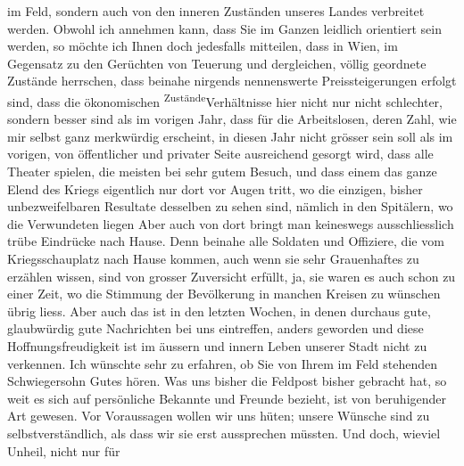\begin{ledgroupsized}[t]{13cm}
               im Feld, sondern auch von den inneren Zuständen unseres Landes verbreitet werden.
               Obwohl ich annehmen kann, dass Sie im Ganzen \label{LL710-1v}\label{LL710-1h}leidlich orientiert sein werden, so möchte ich Ihnen doch jedesfalls mitteilen,
               dass in Wien, im Gegensatz zu den Gerüchten von
               Teuerung und dergleichen, völlig geordnete Zustände herrschen, dass beinahe nirgends
               nennenswerte Preissteigerungen erfolgt sind, dass die ökonomischen \substVorne{}\textsuperscript{Zustände}{\allowbreak}\substDazwischen{}Verhältnisse\substHinten{} hier nicht nur nicht schlechter, sondern besser sind als im vorigen Jahr,
               dass für die Arbeitslosen, deren Zahl, wie mir selbst ganz merkwürdig erscheint, in
               diesen Jahr nicht grösser sein soll als im vorigen, von öffentlicher und privater
               Seite ausreichend {\pb}gesorgt wird, dass alle Theater
               spielen, die meisten bei sehr gutem Besuch, und dass einem das ganze Elend des Kriegs
               eigentlich nur dort vor Augen tritt, wo die einzigen, bisher unbezweifelbaren
               Resultate desselben zu sehen sind, nämlich in den Spitälern, wo die Verwundeten
                  liegen{\dotstwo} Aber auch von dort bringt man keineswegs
               ausschliesslich trübe Eindrücke nach Hause. Denn beinahe alle Soldaten und Offiziere,
               die vom Kriegsschauplatz nach Hause kommen, auch wenn sie sehr Grauenhaftes zu
               erzählen wissen, sind von grosser Zuversicht erfüllt, ja, sie waren es auch schon zu
               einer Zeit, wo die Stimmung der Bevölkerung in manchen Kreisen zu wünschen übrig
               liess. Aber auch das ist in den letzten Wochen, in denen durchaus gute, glaubwürdig
               gute Nachrichten bei uns eintreffen, anders geworden und diese Hoffnungsfreudigkeit
               ist im äussern und innern Leben unserer Stadt nicht zu verkennen.\pend
           \pstart
           Ich wünschte sehr zu erfahren, ob {\pb}Sie von Ihrem
               im Feld stehenden Schwiegersohn Gutes hören. Was uns bisher die Feldpost bisher
               gebracht hat, so weit es sich auf persönliche Bekannte und Freunde bezieht, ist von
               beruhigender Art gewesen.\pend
           \pstart
           Vor Voraussagen wollen wir uns hüten; unsere Wünsche sind zu selbstverständlich, als
               dass wir sie erst aussprechen müssten. Und doch, wieviel Unheil, nicht nur für

\end{ledgroupsized}
